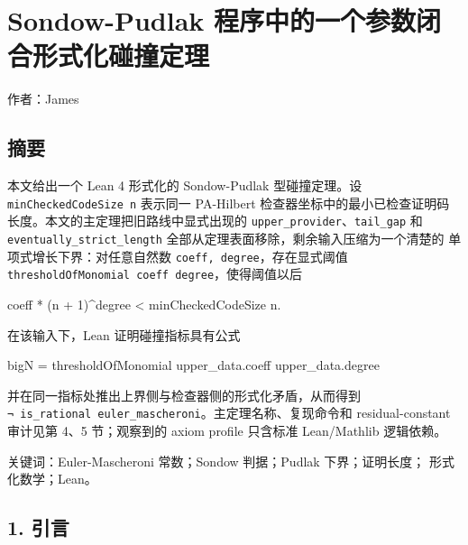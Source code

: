 \documentclass[
  a4paper,
  12pt]{ctexart}
\author{}
\date{}
\newenvironment{Shaded}{}{}
\newcommand{\NormalTok}[1]{#1}
\begin{document}
{
\hypersetup{linkcolor=}
\setcounter{tocdepth}{2}
\tableofcontents
}
\section{Sondow-Pudlak
程序中的一个参数闭合形式化碰撞定理}\label{sondow-pudlak-ux7a0bux5e8fux4e2dux7684ux4e00ux4e2aux53c2ux6570ux95edux5408ux5f62ux5f0fux5316ux78b0ux649eux5b9aux7406}

作者：James

\subsection{摘要}\label{ux6458ux8981}

本文给出一个 Lean 4 形式化的 Sondow-Pudlak 型碰撞定理。设
\texttt{minCheckedCodeSize\ n} 表示同一 PA-Hilbert
检查器坐标中的最小已检查证明码 长度。本文的主定理把旧路线中显式出现的
\texttt{upper\_provider}、\texttt{tail\_gap} 和
\texttt{eventually\_strict\_length}
全部从定理表面移除，剩余输入压缩为一个清楚的
单项式增长下界：对任意自然数 \texttt{coeff,\ degree}，存在显式阈值
\texttt{thresholdOfMonomial\ coeff\ degree}，使得阈值以后

\begin{Shaded}
\begin{Highlighting}[]
\NormalTok{coeff * (n + 1)\^{}degree \textless{} minCheckedCodeSize n.}
\end{Highlighting}
\end{Shaded}

在该输入下，Lean 证明碰撞指标具有公式

\begin{Shaded}
\begin{Highlighting}[]
\NormalTok{bigN = thresholdOfMonomial upper\_data.coeff upper\_data.degree}
\end{Highlighting}
\end{Shaded}

并在同一指标处推出上界侧与检查器侧的形式化矛盾，从而得到
\texttt{¬\ is\_rational\ euler\_mascheroni}。主定理名称、复现命令和
residual-constant 审计见第 4、5 节；观察到的 axiom profile 只含标准
Lean/Mathlib 逻辑依赖。

关键词：Euler-Mascheroni 常数；Sondow 判据；Pudlak 下界；证明长度；
形式化数学；Lean。

\subsection{1. 引言}\label{ux5f15ux8a00}
\end{document}
